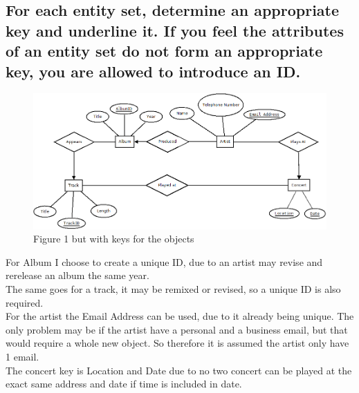 \documentclass[12pt, a4paper]{article}
\begin{document}
		\subsection{For  each  entity  set,  determine  an  appropriate  key  and  underline  it.  If you feel the attributes of an entity set do not form an appropriate key, you are allowed to introduce an ID. }
			\begin{figure}[h!]
				\includegraphics[width=\textwidth]{assets/ER2.png}
				\centering
				\caption{Figure 1 but with keys for the objects}
			\end{figure}
			For Album I choose to create a unique ID, due to an artist may revise and rerelease an album the same year.\\
			The same goes for a track, it may be remixed or revised, so a unique ID is also required.\\
			For the artist the Email Address can be used, due to it already being unique. The only problem may be if the artist have a personal and a business email, but that would require a whole new object. So therefore it is assumed the artist only have 1 email.\\
			The concert key is Location and Date due to no two concert can be played at the exact same address and date if time is included in date.
\end{document}
